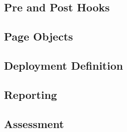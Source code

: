 \subsection{Pre and Post Hooks}
\label{subsec:pre-and-post-hooks}

\subsection{Page Objects}
\label{subsec:page-objects}

\subsection{Deployment Definition}
\label{subsec:deployment-definition}

\subsection{Reporting}
\label{subsec:reporting}

\subsection{Assessment}
\label{subsec:assessment}
